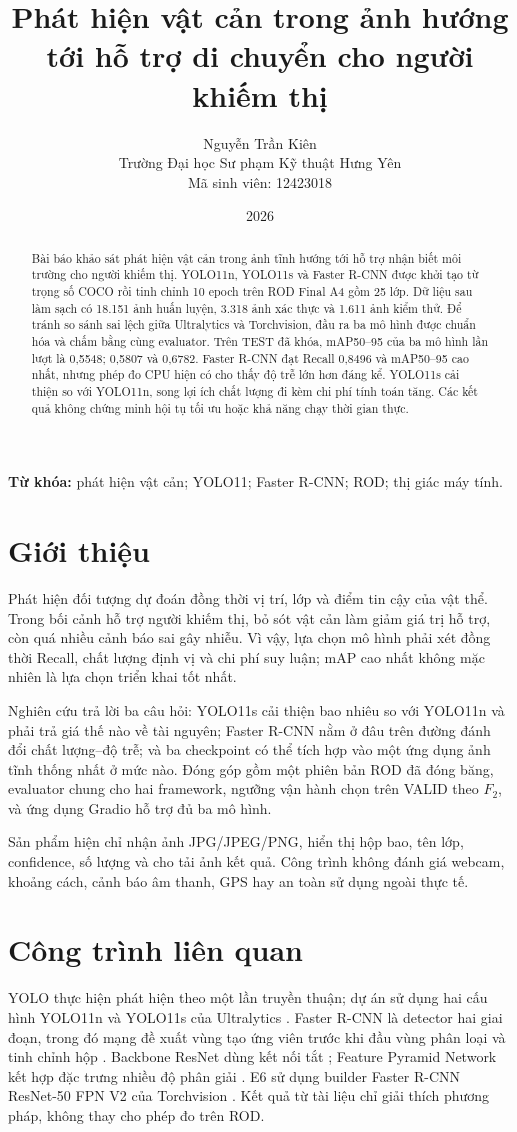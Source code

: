 \documentclass[10pt,a4paper,twocolumn]{article}
\title{Phát hiện vật cản trong ảnh hướng tới hỗ trợ di chuyển cho người khiếm thị}
\author{Nguyễn Trần Kiên\\\small Trường Đại học Sư phạm Kỹ thuật Hưng Yên\\\small Mã sinh viên: 12423018}
\date{2026}
\begin{document}
\maketitle
\begin{abstract}
Bài báo khảo sát phát hiện vật cản trong ảnh tĩnh hướng tới hỗ trợ nhận biết môi trường cho người khiếm thị. YOLO11n, YOLO11s và Faster R-CNN được khởi tạo từ trọng số COCO rồi tinh chỉnh 10 epoch trên ROD Final A4 gồm 25 lớp. Dữ liệu sau làm sạch có 18.151 ảnh huấn luyện, 3.318 ảnh xác thực và 1.611 ảnh kiểm thử. Để tránh so sánh sai lệch giữa Ultralytics và Torchvision, đầu ra ba mô hình được chuẩn hóa và chấm bằng cùng evaluator. Trên TEST đã khóa, mAP50--95 của ba mô hình lần lượt là 0,5548; 0,5807 và 0,6782. Faster R-CNN đạt Recall 0,8496 và mAP50--95 cao nhất, nhưng phép đo CPU hiện có cho thấy độ trễ lớn hơn đáng kể. YOLO11s cải thiện so với YOLO11n, song lợi ích chất lượng đi kèm chi phí tính toán tăng. Các kết quả không chứng minh hội tụ tối ưu hoặc khả năng chạy thời gian thực.
\end{abstract}
\noindent\textbf{Từ khóa:} phát hiện vật cản; YOLO11; Faster R-CNN; ROD; thị giác máy tính.

\section{Giới thiệu}
Phát hiện đối tượng dự đoán đồng thời vị trí, lớp và điểm tin cậy của vật thể. Trong bối cảnh hỗ trợ người khiếm thị, bỏ sót vật cản làm giảm giá trị hỗ trợ, còn quá nhiều cảnh báo sai gây nhiễu. Vì vậy, lựa chọn mô hình phải xét đồng thời Recall, chất lượng định vị và chi phí suy luận; mAP cao nhất không mặc nhiên là lựa chọn triển khai tốt nhất.

Nghiên cứu trả lời ba câu hỏi: YOLO11s cải thiện bao nhiêu so với YOLO11n và phải trả giá thế nào về tài nguyên; Faster R-CNN nằm ở đâu trên đường đánh đổi chất lượng--độ trễ; và ba checkpoint có thể tích hợp vào một ứng dụng ảnh tĩnh thống nhất ở mức nào. Đóng góp gồm một phiên bản ROD đã đóng băng, evaluator chung cho hai framework, ngưỡng vận hành chọn trên VALID theo $F_2$, và ứng dụng Gradio hỗ trợ đủ ba mô hình.

Sản phẩm hiện chỉ nhận ảnh JPG/JPEG/PNG, hiển thị hộp bao, tên lớp, confidence, số lượng và cho tải ảnh kết quả. Công trình không đánh giá webcam, khoảng cách, cảnh báo âm thanh, GPS hay an toàn sử dụng ngoài thực tế.

\section{Công trình liên quan}
YOLO thực hiện phát hiện theo một lần truyền thuận; dự án sử dụng hai cấu hình YOLO11n và YOLO11s của Ultralytics \cite{ultralytics_yolo11}. Faster R-CNN là detector hai giai đoạn, trong đó mạng đề xuất vùng tạo ứng viên trước khi đầu vùng phân loại và tinh chỉnh hộp \cite{ren2015faster}. Backbone ResNet dùng kết nối tắt \cite{he2016resnet}; Feature Pyramid Network kết hợp đặc trưng nhiều độ phân giải \cite{lin2017fpn}. E6 sử dụng builder Faster R-CNN ResNet-50 FPN V2 của Torchvision \cite{torchvision_fasterrcnn}. Kết quả từ tài liệu chỉ giải thích phương pháp, không thay cho phép đo trên ROD.
\end{document}
